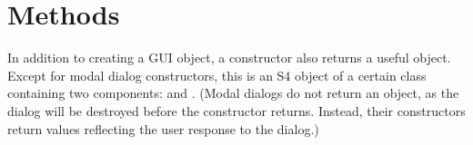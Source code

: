 




\section{Methods}


In addition to creating a GUI object, a constructor also returns a
useful \R\/ object. Except for modal dialog constructors, this is an
S4 object of a certain class containing two components: 
and . (Modal dialogs do not return an
object, as the dialog will be destroyed before the
constructor returns. Instead, their constructors return values reflecting the
user response to the dialog.)


